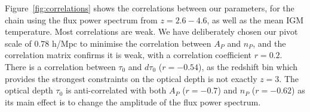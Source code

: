 % 

Figure~\ref{fig:correlations} shows the correlations between our parameters, for the chain using the flux power spectrum from $z=2.6 - 4.6$, as well as the mean IGM temperature. Most correlations are weak. We have deliberately chosen our pivot scale of $0.78$ h/Mpc to minimise the correlation between $A_P$ and $n_P$, and the correlation matrix confirms it is weak, with a correlation coefficient $r=0.2$. 
There is a correlation between $\tau_0$ and $d\tau_0$ ($r=-0.54$), as the redshift bin which provides the strongest constraints on the optical depth is not exactly $z=3$. The optical depth $\tau_0$ is anti-correlated with both $A_P$ ($r=-0.7$) and $n_P$ ($r=-0.62$) as its main effect is to change the amplitude of the flux power spectrum. 

